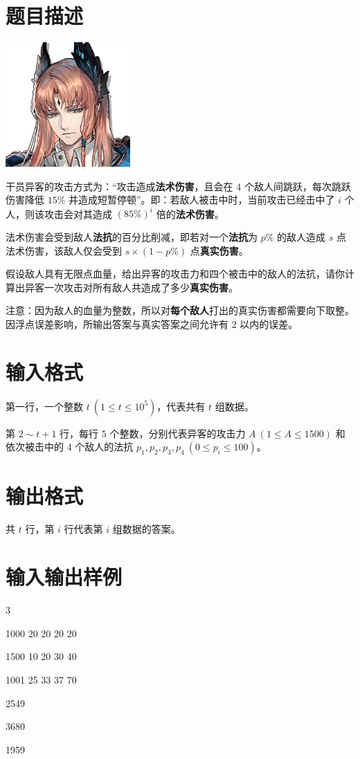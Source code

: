 \documentclass{../cpct/ctpro}
\begin{document}
\begin{center}
                 
\end{center}

\makeproblem
\section*{题目描述}

\begin{center}
    \includegraphics[scale=0.5]{images/God.png}
\end{center}

干员异客的攻击方式为：“攻击造成\textbf{法术伤害}，且会在 $4$ 个敌人间跳跃，每次跳跃伤害降低 $15 \%$ 并造成短暂停顿”。即：若敌人被击中时，当前攻击已经击中了 $i$ 个人，则该攻击会对其造成 $(85 \%)^i$ 倍的\textbf{法术伤害}。

法术伤害会受到敌人\textbf{法抗}的百分比削减，即若对一个\textbf{法抗}为 $p \%$ 的敌人造成 $s$ 点法术伤害，该敌人仅会受到 $s \times (1-p \%)$ 点\textbf{真实伤害}。

假设敌人具有无限点血量，给出异客的攻击力和四个被击中的敌人的法抗，请你计算出异客一次攻击对所有敌人共造成了多少\textbf{真实伤害}。

注意：因为敌人的血量为整数，所以对\textbf{每个敌人}打出的真实伤害都需要向下取整。因浮点误差影响，所输出答案与真实答案之间允许有 $2$ 以内的误差。

\section*{输入格式}

第一行，一个整数 $t~(1 \leq t \leq {10}^5)$，代表共有 $t$ 组数据。

第 $2 \sim t+1$ 行，每行 $5$ 个整数，分别代表异客的攻击力 $A~(1 \leq A \leq 1500)$ 和依次被击中的 $4$ 个敌人的法抗 $p_1,p_2,p_3,p_4~(0 \leq p_i \leq 100)$。

\section*{输出格式}

共 $t$ 行，第 $i$ 行代表第 $i$ 组数据的答案。

\section*{输入输出样例}

\testcasetab
{
    3\par
    1000 20 20 20 20\par
    1500 10 20 30 40\par
    1001 25 33 37 70
}
{
    2549\par
    3680\par
    1959
}
\end{document}
